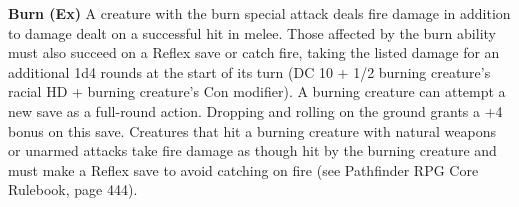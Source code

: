 \textbf{Burn (Ex)} A creature with the burn special attack deals fire damage in addition to damage dealt on a successful hit in melee. Those affected by the burn ability must also succeed on a Reflex save or catch fire, taking the listed damage for an additional 1d4 rounds at the start of its turn (DC 10 + 1/2 burning creature’s racial HD + burning creature’s Con modifier). A burning creature can attempt a new save as a full-round action. Dropping and rolling on the ground grants a +4 bonus on this save. Creatures that hit a burning creature with natural weapons or unarmed attacks take fire damage as though hit by the burning creature and must make a Reflex save to avoid catching on fire (see Pathfinder RPG Core Rulebook, page 444). \\

\newpage
